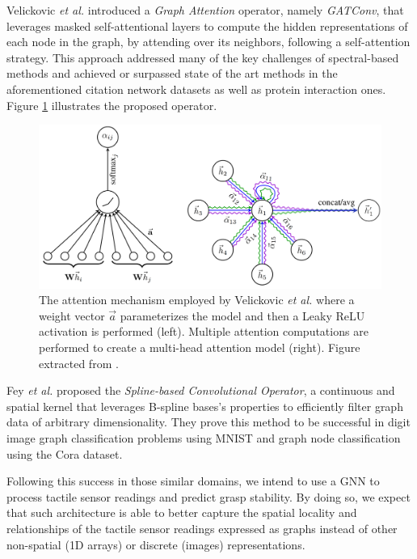 Velickovic \emph{et al.} \cite{Velickovic2017} introduced a \emph{Graph Attention} operator, namely \emph{GATConv}, that leverages masked self-attentional layers to compute the hidden representations of each node in the graph, by attending over its neighbors, following a self-attention strategy. This approach addressed many of the key challenges of spectral-based methods and achieved or surpassed state of the art methods in the aforementioned citation network datasets as well as protein interaction ones. Figure \ref{fig:tactile:velickovic} illustrates the proposed operator.

\begin{figure}[!htb]
    \centering
    \includegraphics[width=0.95\linewidth]{Figures/Tactile/velickovic}
    \caption{The attention mechanism employed by Velickovic \emph{et al.}\cite{Velickovic2017} where a weight vector $\vec{a}$ parameterizes the model and then a Leaky \ac{ReLU} activation is performed (left). Multiple attention computations are performed to create a multi-head attention model (right). Figure extracted from \cite{Velickovic2017}.}
    \label{fig:tactile:velickovic}
\end{figure}

Fey \emph{et al.} \cite{Fey2018} proposed the \emph{Spline-based Convolutional Operator}, a continuous and spatial kernel that leverages B-spline bases's properties to efficiently filter graph data of arbitrary dimensionality. They prove this method to be successful in digit image graph classification problems using \acs{MNIST} and graph node classification using the Cora dataset.

Following this success in those similar domains, we intend to use a \acs{GNN} to process tactile sensor readings and predict grasp stability. By doing so, we expect that such architecture is able to better capture the spatial locality and relationships of the tactile sensor readings expressed as graphs instead of other non-spatial (\acs{1D} arrays) or discrete (images) representations.

